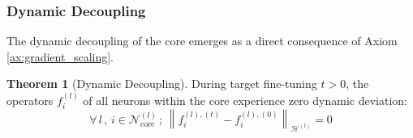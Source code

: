 \documentclass[11pt, a4paper, copyright, gdm]{google}
\newcommand{\norm}[1]{\left\lVert#1\right\rVert}
\newcommand{\calH}{\mathcal{H}}
\newcommand{\calN}{\mathcal{N}}
\theoremstyle{definition}
\newtheorem{theorem}{Theorem}[section]
\begin{document}
\subsubsection{Dynamic Decoupling}
The dynamic decoupling of the core emerges as a direct consequence of Axiom \ref{ax:gradient_scaling}.

\begin{theorem}[Dynamic Decoupling]
\label{thm:dynamic_decoupling}
During target fine-tuning $t>0$, the operators $f_i^{(l)}$ of all neurons within the core experience zero dynamic deviation:
\begin{equation}
\forall \, l \,,\, i \in \calN^{(l)}_{\text{core}} \,;\, \norm{f_i^{(l), (t)} - f_i^{(l), (0)}}_{\calH^{(l)}} = 0
\end{equation}
\end{theorem}
\end{document}
